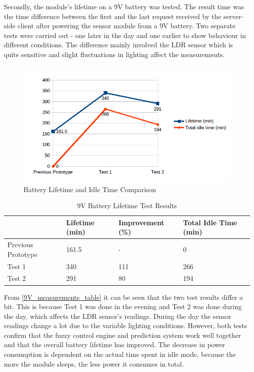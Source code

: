 Secondly, the module's lifetime on a 9V battery was tested. The result time was the time difference between the first and the last request received by the server-side client after powering the sensor module from a 9V battery. Two separate tests were carried out - one later in the day and one earlier to show behaviour in different conditions. The difference mainly involved the LDR sensor which is quite sensitive and slight fluctuations in lighting affect the measurements. 

\begin{figure}[h!]
\centering
\includegraphics[scale=0.9]{4/figures/9V_test_results.png}
\caption{Battery Lifetime and Idle Time Comparison}
\label{9V_test_results}
\end{figure}

\begin{table}[h]
\centering
  \begin{tabular}{|l|l|l|l|}
    \hline
     & Lifetime (min) & Improvement (\%) & Total Idle Time (min)\\ \hline
    Previous Prototype & 161.5 & - & 0\\ \hline
    Test 1 & 340 & 111 & 266 \\ \hline
    Test 2 & 291 & 80 & 194 \\ \hline
  \end{tabular}
\caption{9V Battery Lifetime Test Results}
\label{9V_measurements_table}
\end{table}

From \autoref{9V_measurements_table} it can be seen that the two test results differ a bit. This is because Test 1 was done in the evening and Test 2 was done during the day, which affects the LDR sensor's readings. During the day the sensor readings change a lot due to the variable lighting conditions. However, both tests confirm that the fuzzy control engine and prediction system work well together and that the overall battery lifetime has improved. The decrease in power consumption is dependent on the actual time spent in idle mode, because the more the module sleeps, the less power it consumes in total. 

